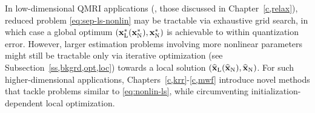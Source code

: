 In low-dimensional
QMRI applications 
(\eg, those discussed in Chapter~\ref{c,relax}), 
reduced problem \eqref{eq:sep-ls-nonlin}
may be tractable via exhaustive grid search,
in which case a global optimum 
$\paren{\bmxl^*\paren{\bmxn^*},\bmxn^*}$
is achievable to within quantization error.
However, larger estimation problems 
involving more nonlinear parameters
might still be tractable 
only via iterative optimization
(see Subsection~\ref{ss,bkgrd,opt,loc})
towards a local solution 
$\paren{\est{\bmx}_\mathrm{L}\paren{\est{\bmx}_\mathrm{N}},\est{\bmx}_\mathrm{N}}$.
For such higher-dimensional applications,
Chapters~\ref{c,krr}-\ref{c,mwf} introduce novel methods 
that tackle problems similar to \eqref{eq:nonlin-ls},
while circumventing initialization-dependent local optimization.
